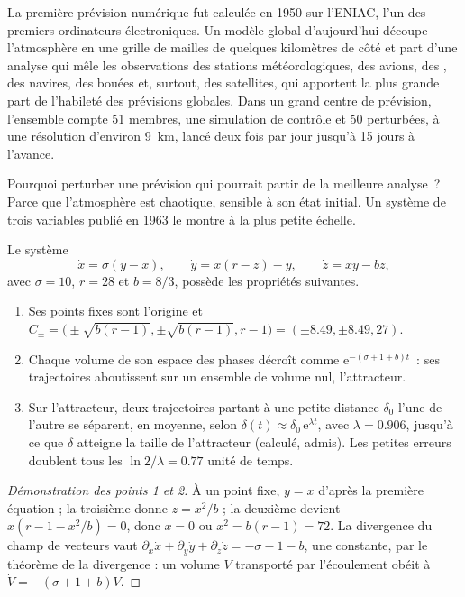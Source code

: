 La première prévision numérique fut calculée en 1950 sur l'ENIAC, l'un des premiers
ordinateurs électroniques. Un modèle global d'aujourd'hui découpe l'atmosphère en une grille de mailles de quelques kilomètres
de côté et part d'une analyse qui mêle les observations des stations météorologiques, des avions,
des , des navires, des bouées et, surtout, des satellites, qui apportent la plus grande part
de l'habileté des prévisions globales. Dans un grand centre de prévision, l'ensemble
compte 51 membres, une simulation de contrôle et 50 perturbées, à une résolution d'environ \qty{9}{km}, lancé
deux fois par jour jusqu'à 15 jours à l'avance.

Pourquoi perturber une prévision qui pourrait partir de la meilleure analyse~? Parce que l'atmosphère est
chaotique, sensible à son état initial. Un système de trois variables publié en 1963 le montre
à la plus petite échelle.

\begin{proposition}\label{prop:b2:weather-systems:lorenz}
Le système
\[
  \dot x = \sigma(y - x), \qquad \dot y = x(r - z) - y, \qquad \dot z = xy - bz,
\]
avec $\sigma = 10$, $r = 28$ et $b = 8/3$, possède les propriétés suivantes.
\begin{enumerate}
  \item Ses points fixes sont l'origine et $C_\pm = \bigl(\pm\sqrt{b(r - 1)}, \pm\sqrt{b(r - 1)},
        r - 1\bigr) = (\pm 8.49, \pm 8.49, 27)$.
  \item Chaque volume de son espace des phases décroît comme $\mathrm{e}^{-(\sigma + 1 + b)t}$~: ses
        trajectoires aboutissent sur un ensemble de volume nul, l'attracteur.
  \item Sur l'attracteur, deux trajectoires partant à une petite distance $\delta_0$ l'une de l'autre se séparent,
        en moyenne, selon $\delta(t) \approx \delta_0\,\mathrm{e}^{\lambda t}$, avec $\lambda =
        0.906$, jusqu'à ce que $\delta$ atteigne la taille de l'attracteur (calculé, admis). Les petites
        erreurs doublent tous les $\ln 2/\lambda = 0.77$ unité de temps.
\end{enumerate}
\end{proposition}

\begin{proof}[Démonstration des points 1 et 2]
À un point fixe, $y = x$ d'après la première équation ; la troisième donne $z = x^2/b$ ; la deuxième
devient $x(r - 1 - x^2/b) = 0$, donc $x = 0$ ou $x^2 = b(r - 1) = 72$. La divergence du champ de vecteurs vaut
$\partial_x\dot x + \partial_y\dot y + \partial_z\dot z = -\sigma - 1 - b$, une constante, par le théorème
de la divergence : un volume $V$ transporté par l'écoulement obéit à $\dot V =
-(\sigma + 1 + b)V$.
\end{proof}


